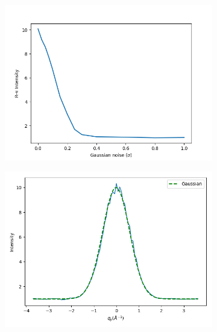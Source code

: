 \documentclass{article}
\begin{document}
  \begin{figure}[!htb]
  \centering
  \begin{subfigure}{0.32\textwidth}
  \includegraphics[width=\textwidth]{random_columns_z_noise.png}
  \caption{}\label{fig:z_noise_columns}
  \end{subfigure}
  \begin{subfigure}{0.32\textwidth}
  \includegraphics[width=\textwidth]{random_columns_gaussian.png}
  \caption{}\label{fig:FWHM_fit_columns}
  \end{subfigure}
  \begin{subfigure}{0.32\textwidth}

\end{subfigure}
\end{figure}
\end{document}

